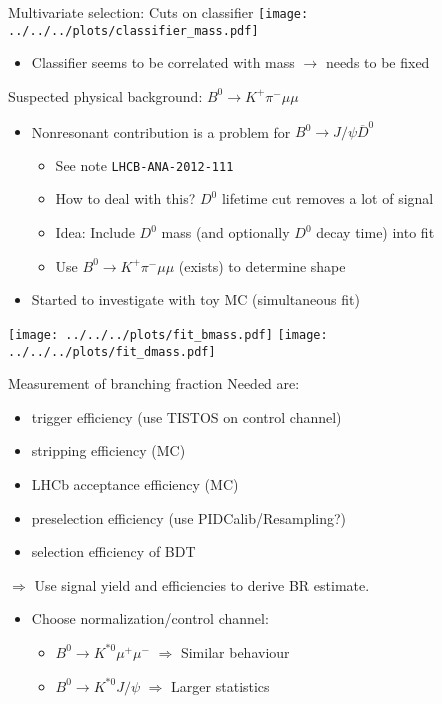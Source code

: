 \documentclass[compress,aspectratio=43]{beamer}
\begin{document}
\begin{frame}{Multivariate selection: Cuts on classifier}
  \centering
  \texttt{[image: ../../../plots/classifier\_mass.pdf]}
  \begin{itemize}
    \item {\small Classifier seems to be correlated with mass $\rightarrow$ needs to be fixed}
  \end{itemize}
\end{frame}

\begin{frame}{Suspected physical background: $B^0\to K^+\pi^-\mu\mu$}
  \begin{itemize}
      \item Nonresonant contribution is a problem for $B^0\to J/\psi \overline{D}^0$
      \begin{itemize}
        \item See note \texttt{LHCB-ANA-2012-111}
        \item How to deal with this? $D^0$ lifetime cut removes a lot of signal
        \item Idea: Include $D^0$ mass (and optionally $D^0$ decay time) into fit 
        \item Use $B^0\to K^+\pi^-\mu\mu$ (exists) to determine shape
      \end{itemize}
    \item Started to investigate with toy MC (simultaneous fit)
  \end{itemize}
  \centering
  \texttt{[image: ../../../plots/fit\_bmass.pdf]}
  \texttt{[image: ../../../plots/fit\_dmass.pdf]}
\end{frame}

\begin{frame}{Measurement of branching fraction}
  Needed are:
  \begin{itemize}
    \item trigger efficiency (use TISTOS on control channel)
    \item stripping efficiency (MC)
    \item LHCb acceptance efficiency (MC)
    \item preselection efficiency (use PIDCalib/Resampling?)
    \item selection efficiency of BDT
  \end{itemize}
  $\Rightarrow$ Use signal yield and efficiencies to derive BR estimate.
  \begin{itemize}
    \item Choose normalization/control channel:
      \begin{itemize}
        \item $B^0\to K^{*0}\mu^+\mu^-$ $\Rightarrow$ Similar behaviour
        \item $B^0 \to K^{*0}J\!/\!\psi$ $\Rightarrow$ Larger statistics
      \end{itemize}
  \end{itemize}
\end{frame}
\end{document}
